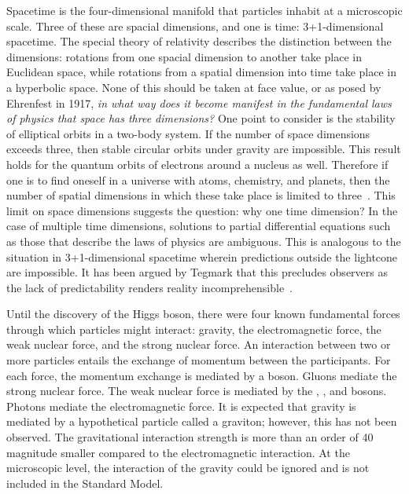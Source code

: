 
Spacetime is the four-dimensional manifold that particles inhabit at a microscopic scale.
Three of these are spacial dimensions, and one is time: 3+1-dimensional spacetime.
The special theory of relativity describes the distinction between the dimensions: rotations from one spacial dimension to another take place in Euclidean space, while rotations from a spatial dimension into time take place in a hyperbolic space.
None of this should be taken at face value, or as posed by Ehrenfest in 1917, \emph{in what way does it become manifest in the fundamental laws of physics that space has three dimensions?}
One point to consider is the stability of elliptical orbits in a two-body system.
If the number of space dimensions exceeds three, then stable circular orbits under gravity are impossible.
This result holds for the quantum orbits of electrons around a nucleus as well.
Therefore if one is to find oneself in a universe with atoms, chemistry, and planets, then the number of spatial dimensions in which these take place is limited to three~\cite{ehrenfest}.
This limit on space dimensions suggests the question: why one time dimension?
In the case of multiple time dimensions, solutions to partial differential equations such as those that describe the laws of physics are ambiguous.
This is analogous to the situation in 3+1-dimensional spacetime wherein predictions outside the lightcone are impossible.
It has been argued by Tegmark that this precludes observers as the lack of predictability renders reality incomprehensible~\cite{tegmark-time}.


Until the discovery of the Higgs boson, there were four known fundamental forces through which particles might interact: gravity, the electromagnetic force, the weak nuclear force, and the strong nuclear force.
An interaction between two or more particles entails the exchange of momentum between the participants.
For each force, the momentum exchange is mediated by a boson.
Gluons mediate the strong nuclear force.
The weak nuclear force is mediated by the \Wp, \Wm, and \Z bosons.
Photons mediate the electromagnetic force.
It is expected that gravity is mediated by a hypothetical particle called a graviton; however, this has not been observed. The gravitational interaction strength is more than an order of 40 magnitude smaller compared to the electromagnetic interaction. At the microscopic level, the interaction of the gravity could be ignored and is not included in the Standard Model.

